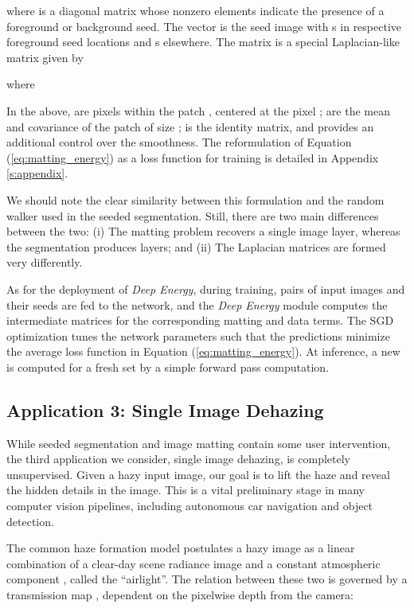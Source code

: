 \documentclass[journal]{IEEEtran}
\begin{document}
where  is a diagonal matrix whose nonzero elements indicate the presence of a foreground or background seed. The vector  is the seed image with s in respective foreground seed locations and s elsewhere. The matrix  is a special Laplacian-like matrix \cite{closed_form_matting} given by

where

In the above,  are pixels within the patch , centered at the pixel ;  are the mean and covariance of the patch of size ;  is the identity matrix, and  provides an additional control over the smoothness. The reformulation of Equation (\ref{eq:matting_energy}) as a loss function for training is detailed in Appendix \ref{s:appendix}.

We should note the clear similarity between this formulation and the random walker used in the seeded segmentation. Still, there are two main differences between the two: (i) The matting problem recovers a single image layer, whereas the segmentation produces  layers; and (ii) The Laplacian  matrices are formed very differently. 

As for the deployment of \emph{Deep Energy}, during training, pairs of input images and their seeds  are fed to the network, and the \emph{Deep Energy} module computes the intermediate  matrices for the corresponding matting and data terms. The SGD optimization tunes the network parameters such that the predictions  minimize the average loss function in Equation (\ref{eq:matting_energy}). At inference, a new  is computed for a fresh set   by a simple forward pass computation.



\subsection{Application 3: Single Image Dehazing} \label{ss:dehazing}

While seeded segmentation and image matting contain some user intervention, the third application we consider, single image dehazing, is completely unsupervised. Given a hazy input image, our goal is to lift the haze and reveal the hidden details in the image. This is a vital preliminary stage in many computer vision pipelines, including autonomous car navigation and object detection.

The common haze formation model \cite{haze_model} postulates a hazy image  as a linear combination of a clear-day scene radiance image  and a constant atmospheric component , called the ``airlight''. The relation between these two is governed by a transmission map , dependent on the pixelwise depth  from the camera:
\end{document}

